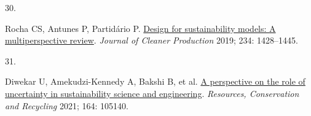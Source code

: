\documentclass[
  11pt,
  a4paperpaper,
  onecolumn]{article}
\newlength{\cslhangindent}
\newlength{\csllabelwidth}
\newlength{\cslentryspacingunit} %
\newenvironment{CSLReferences}[2] %
 {%
  \setlength{\parindent}{0pt}
  \ifodd #1
  \let\oldpar\par
  \def\par{\hangindent=\cslhangindent\oldpar}
  \fi
  \setlength{\parskip}{#2\cslentryspacingunit}
 }%
 {}
\newcommand{\CSLLeftMargin}[1]{\parbox[t]{\csllabelwidth}{#1}}
\newcommand{\CSLRightInline}[1]{\parbox[t]{\linewidth - \csllabelwidth}{#1}\break}
\begin{document}
\begin{CSLReferences}{0}{0}
\leavevmode{}%
\CSLLeftMargin{30. }%
\CSLRightInline{Rocha CS, Antunes P, Partidário P.
\href{https://doi.org/10.1016/j.jclepro.2019.06.108}{Design for
sustainability models: {A} multiperspective review}. \emph{Journal of
Cleaner Production} 2019; 234: 1428--1445.}

\leavevmode{}%
\CSLLeftMargin{31. }%
\CSLRightInline{Diwekar U, Amekudzi-Kennedy A, Bakshi B, et al.
\href{https://doi.org/10.1016/j.resconrec.2020.105140}{A perspective on
the role of uncertainty in sustainability science and engineering}.
\emph{Resources, Conservation and Recycling} 2021; 164: 105140.}

\end{CSLReferences}
\end{document}

